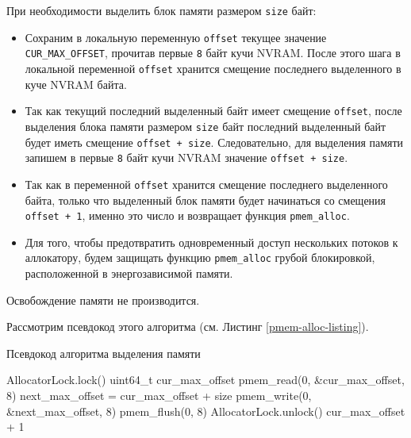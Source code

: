 \documentclass[times,specification,annotation]{itmo-student-thesis}
\begin{document}
При необходимости выделить блок памяти размером \texttt{size} байт:

\begin{itemize}
    \item Сохраним в локальную переменную \texttt{offset} текущее значение \texttt{CUR\_MAX\_OFFSET}, прочитав первые \texttt{8} байт кучи NVRAM. После этого шага в локальной переменной \texttt{offset} хранится смещение последнего выделенного в куче NVRAM байта.
    
    \item Так как текущий последний выделенный байт имеет смещение \texttt{offset}, после выделения блока памяти размером \texttt{size} байт последний выделенный байт будет иметь смещение \texttt{offset + size}. Следовательно, для выделения памяти запишем в первые \texttt{8} байт кучи NVRAM значение \texttt{offset + size}.
    
    \item Так как в переменной \texttt{offset} хранится смещение последнего выделенного байта, только что выделенный блок памяти будет начинаться со смещения \texttt{offset + 1}, именно это число и возвращает функция \texttt{pmem\_alloc}.
    
    \item Для того, чтобы предотвратить одновременный доступ нескольких потоков к аллокатору, будем защищать функцию \texttt{pmem\_alloc} грубой блокировкой, расположенной в энергозависимой памяти.
\end{itemize}

\bigbreak

Освобождение памяти не производится.

Рассмотрим псевдокод этого алгоритма (см. Листинг \ref{pmem-alloc-listing}).

\begin{algorithm}[H]
\caption{Псевдокод алгоритма выделения памяти}
\label{pmem-alloc-listing}
\begin{algorithmic}
        \State AllocatorLock.lock()
        \State uint64\_t cur\_max\_offset
        \State pmem\_read(0, \&cur\_max\_offset, 8)
        \State next\_max\_offset = cur\_max\_offset + size
        \State pmem\_write(0, \&next\_max\_offset, 8)
        \State pmem\_flush(0, 8)
        \State AllocatorLock.unlock()
        \State \Return cur\_max\_offset + 1
    \EndFunction
    
    \bigbreak
    \bigbreak

    
        \State \Return
    \EndFunction
\end{algorithmic}
\end{algorithm}
\end{document}
